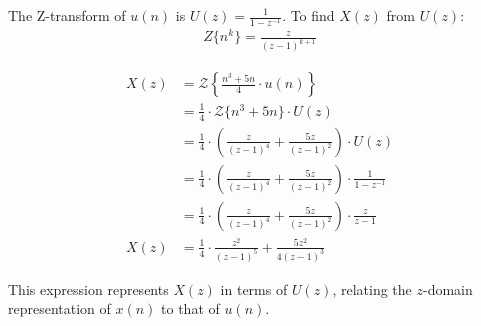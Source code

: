 \documentclass{article}
\begin{document}
The Z-transform of \(u(n)\) is \(U(z) = \frac{1}{1 - z^{-1}}\). To find \(X(z)\) from \(U(z):\)
\begin{align}
Z\{n^k\}=\frac{z}{(z - 1)^{k+1}}
\end{align}

\begin{align}
X(z) &= \mathcal{Z}\left\{\frac{n^3 + 5n}{4} \cdot u(n)\right\} \\
&= \frac{1}{4} \cdot \mathcal{Z}\{n^3 + 5n\} \cdot U(z) \nonumber \\
&= \frac{1}{4} \cdot \left(\frac{z}{(z - 1)^4} + \frac{5z}{(z - 1)^2}\right) \cdot U(z) \nonumber \\
&= \frac{1}{4} \cdot \left(\frac{z}{(z - 1)^4} + \frac{5z}{(z - 1)^2}\right) \cdot \frac{1}{1 - z^{-1}} \nonumber \\
&= \frac{1}{4} \cdot \left(\frac{z}{(z - 1)^4} + \frac{5z}{(z - 1)^2}\right) \cdot \frac{z}{z - 1} \nonumber \\
X(z)&= \frac{1}{4} \cdot \frac{z^2}{(z - 1)^5} + \frac{5z^2}{4(z - 1)^3} 
\end{align}

This expression represents \(X(z)\) in terms of \(U(z)\), relating the \(z\)-domain representation of \(x(n)\) to that of \(u(n)\).
\end{document}
